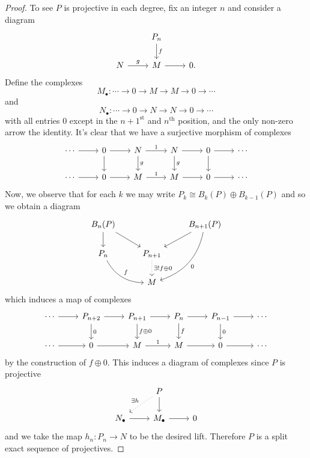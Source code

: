 \documentclass[10pt]{amsart}
\begin{document}
\begin{ex}
\begin{proof}
    To see $P$ is projective in each degree, fix an integer $n$ and consider a diagram
    $$\begin{tikzcd}
      & P_n\arrow{d}{f} & \\
      N \arrow{r}{g} & M\arrow{r} & 0.
    \end{tikzcd}$$
    Define the complexes
    $$M_\bullet: \cdots \rightarrow 0 \rightarrow M \rightarrow M \rightarrow 0 \rightarrow \cdots$$
    and
    $$N_\bullet: \cdots \rightarrow 0 \rightarrow N \rightarrow N \rightarrow 0 \rightarrow \cdots$$
    with all entries 0 except in the $n+1^\text{st}$ and $n^\text{th}$ position, and the only non-zero arrow the identity.
    It's clear that we have a surjective morphism of complexes
    $$\begin{tikzcd}
      \cdots \arrow{r} & 0 \arrow{d} \arrow{r} & N \arrow{r}{1}\arrow{d}{g} & N \arrow{r}\arrow{d}{g} & 0 \arrow{d} \arrow{r} & \cdots\\
      \cdots \arrow{r} & 0 \arrow{r} & M \arrow{r}{1} & M \arrow{r} & 0 \arrow{r} & \cdots
    \end{tikzcd}$$
    Now, we observe that for each $k$ we may write $P_k \cong B_k(P) \oplus B_{k-1}(P)$ and so we obtain a diagram
    $$\begin{tikzcd}
      B_n(P)\arrow{d}\arrow{rd} & & B_{n+1}(P)\arrow{dl}\arrow[bend left]{ddl}{0}\\
      P_n\arrow[bend right]{rd}{f} & P_{n+1}\arrow[dotted]{d}{\exists! f \oplus 0} &\\
      & M &
    \end{tikzcd}$$
    which induces a map of complexes
    $$\begin{tikzcd}
      \cdots \arrow{r} & P_{n+2}\arrow{d}{0} \arrow{r} & P_{n+1} \arrow{d}{f \oplus 0}\arrow{r} & P_n \arrow{d}{f}\arrow{r} & P_{n-1} \arrow{d}{0}\arrow{r} & \cdots\\
      \cdots \arrow{r} & 0 \arrow{r} & M \arrow{r}{1} & M \arrow{r} & 0 \arrow{r} & \cdots
    \end{tikzcd}$$
    by the construction of $f \oplus 0$.
    This induces a diagram of complexes since $P$ is projective
    $$\begin{tikzcd}
      & P\arrow{d}\arrow[dotted,swap]{ld}{\exists h} & \\
      N_\bullet \arrow{r} & M_\bullet \arrow{r} & 0
    \end{tikzcd}$$
    and we take the map $h_n: P_n \rightarrow N$ to be the desired lift.
    Therefore $P$ is a split exact sequence of projectives.


\end{proof}
\end{ex}
\end{document}
